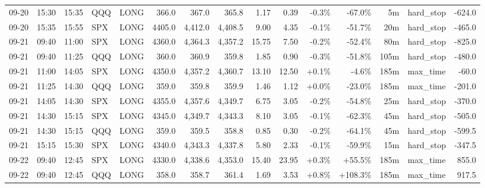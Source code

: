\documentclass[11pt,a4paper,twoside]{article}
\begin{document}
\begin{landscape}
\begin{center}
\begin{longtable}{>{\color{txtmain}}l l l l l r r r r r r r r >{\color{txtmain}}l r}
09-20 & 15:30 & 15:35 & QQQ & LONG & 366.0 & 367.0 & 365.8 & 1.17 & 0.39 & \textcolor{lossred}{-0.3\%} & \textcolor{lossred}{-67.0\%} & 5m & hard\_stop & \textcolor{lossred}{-624.0} \\
09-20 & 15:35 & 15:55 & SPX & LONG & 4405.0 & 4,412.0 & 4,408.5 & 9.00 & 4.35 & \textcolor{lossred}{-0.1\%} & \textcolor{lossred}{-51.7\%} & 20m & hard\_stop & \textcolor{lossred}{-465.0} \\
09-21 & 09:40 & 11:00 & SPX & LONG & 4360.0 & 4,364.3 & 4,357.2 & 15.75 & 7.50 & \textcolor{lossred}{-0.2\%} & \textcolor{lossred}{-52.4\%} & 80m & hard\_stop & \textcolor{lossred}{-825.0} \\
09-21 & 09:40 & 11:25 & QQQ & LONG & 360.0 & 360.9 & 359.8 & 1.85 & 0.90 & \textcolor{lossred}{-0.3\%} & \textcolor{lossred}{-51.8\%} & 105m & hard\_stop & \textcolor{lossred}{-480.0} \\
09-21 & 11:00 & 14:05 & SPX & LONG & 4350.0 & 4,357.2 & 4,360.7 & 13.10 & 12.50 & \textcolor{wingreen}{+0.1\%} & \textcolor{lossred}{-4.6\%} & 185m & max\_time & \textcolor{lossred}{-60.0} \\
09-21 & 11:25 & 14:30 & QQQ & LONG & 359.0 & 359.8 & 359.9 & 1.46 & 1.12 & \textcolor{wingreen}{+0.0\%} & \textcolor{lossred}{-23.0\%} & 185m & max\_time & \textcolor{lossred}{-201.0} \\
09-21 & 14:05 & 14:30 & SPX & LONG & 4355.0 & 4,357.6 & 4,349.7 & 6.75 & 3.05 & \textcolor{lossred}{-0.2\%} & \textcolor{lossred}{-54.8\%} & 25m & hard\_stop & \textcolor{lossred}{-370.0} \\
09-21 & 14:30 & 15:15 & SPX & LONG & 4345.0 & 4,349.7 & 4,343.3 & 8.10 & 3.05 & \textcolor{lossred}{-0.1\%} & \textcolor{lossred}{-62.3\%} & 45m & hard\_stop & \textcolor{lossred}{-505.0} \\
09-21 & 14:30 & 15:15 & QQQ & LONG & 359.0 & 359.5 & 358.8 & 0.85 & 0.30 & \textcolor{lossred}{-0.2\%} & \textcolor{lossred}{-64.1\%} & 45m & hard\_stop & \textcolor{lossred}{-599.5} \\
09-21 & 15:15 & 15:30 & SPX & LONG & 4340.0 & 4,343.3 & 4,337.8 & 5.80 & 2.33 & \textcolor{lossred}{-0.1\%} & \textcolor{lossred}{-59.9\%} & 15m & hard\_stop & \textcolor{lossred}{-347.5} \\
09-22 & 09:40 & 12:45 & SPX & LONG & 4330.0 & 4,338.6 & 4,353.0 & 15.40 & 23.95 & \textcolor{wingreen}{+0.3\%} & \textcolor{wingreen}{+55.5\%} & 185m & max\_time & \textcolor{wingreen}{855.0} \\
09-22 & 09:40 & 12:45 & QQQ & LONG & 358.0 & 358.7 & 361.4 & 1.69 & 3.53 & \textcolor{wingreen}{+0.8\%} & \textcolor{wingreen}{+108.3\%} & 185m & max\_time & \textcolor{wingreen}{917.5} \\

\end{longtable}
\end{center}
\end{landscape}
\end{document}

